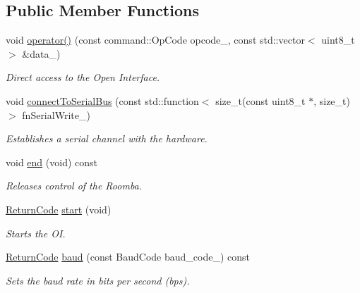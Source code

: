 \subsection*{Public Member Functions}
\begin{DoxyCompactItemize}
\item 
void \hyperlink{classroomba_1_1series500_1_1_open_interface_a3da6204e57a44fbd562fe5711126b069}{operator()} (const command\+::\+Op\+Code opcode\+\_\+, const std\+::vector$<$ uint8\+\_\+t $>$ \&data\+\_\+)
\begin{DoxyCompactList}\small\item\em Direct access to the Open Interface. \end{DoxyCompactList}\item 
void \hyperlink{classroomba_1_1series500_1_1_open_interface_a8ae1fddf62ac384a3956ee44fa4b51ee}{connect\+To\+Serial\+Bus} (const std\+::function$<$ size\+\_\+t(const uint8\+\_\+t $\ast$, size\+\_\+t)$>$ fn\+Serial\+Write\+\_\+)
\begin{DoxyCompactList}\small\item\em Establishes a serial channel with the hardware. \end{DoxyCompactList}\item 
void \hyperlink{classroomba_1_1series500_1_1_open_interface_a8a4ce79aebcc3a1c79ea66eb33dc0ec8}{end} (void) const 
\begin{DoxyCompactList}\small\item\em Releases control of the Roomba. \end{DoxyCompactList}\item 
\hyperlink{classroomba_1_1series500_1_1_open_interface_a43fc2ae1216e57cfb46901331b9ab4c7}{Return\+Code} \hyperlink{classroomba_1_1series500_1_1_open_interface_a5a0876c4910ead045cde79d49a99137a}{start} (void)
\begin{DoxyCompactList}\small\item\em Starts the O\+I. \end{DoxyCompactList}\item 
\hyperlink{classroomba_1_1series500_1_1_open_interface_a43fc2ae1216e57cfb46901331b9ab4c7}{Return\+Code} \hyperlink{classroomba_1_1series500_1_1_open_interface_a87e093214d5f7542062ac180d109f4fa}{baud} (const Baud\+Code baud\+\_\+code\+\_\+) const 
\begin{DoxyCompactList}\small\item\em Sets the baud rate in bits per second (bps). \end{DoxyCompactList}\item 

\end{DoxyCompactItemize}
